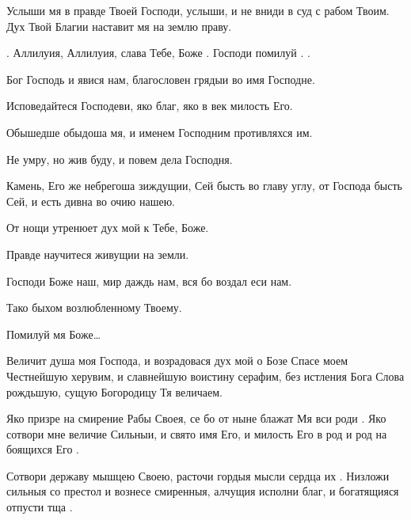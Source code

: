 \begin{mymulticols}
Услыши мя в правде Твоей Господи, услыши, и не вниди в суд с рабом Твоим. Дух Твой Благии наставит мя на землю праву. 

. Аллилуия, Аллилуия, слава Тебе, Боже . Господи помилуй . . 

 Бог Господь и явися нам, благословен грядыи во имя Господне.

 Исповедайтеся Господеви, яко благ, яко в век милость Его.


 Обышедше обыдоша мя, и именем Господним противляхся им.


 Не умру, но жив буду, и повем дела Господня.


 Камень, Его же небрегоша зиждущии, Сей бысть во главу углу, от Господа бысть Сей, и есть дивна во очию нашею. 




 От нощи утренюет дух мой к Тебе, Боже.


 Правде научитеся живущии на земли.


 Господи Боже наш, мир даждь нам, вся бо воздал еси нам.


 Тако быхом возлюбленному Твоему.






Помилуй мя Боже…


 Величит душа моя Господа, и возрадовася дух мой о Бозе Спасе моем  Честнейшую херувим, и славнейшую воистину серафим, без истления Бога Слова рождьшую, сущую Богородицу Тя величаем. 

Яко призре на смирение Рабы Своея, се бо от ныне блажат Мя вси роди . Яко сотвори мне величие Сильныи, и свято имя Его, и милость Его в род и род на боящихся Его . 

Сотвори державу мышцею Своею, расточи гордыя мысли сердца их . Низложи сильныя со престол и вознесе смиренныя, алчущия исполни благ, и богатящияся отпусти тща . 


\end{mymulticols}
